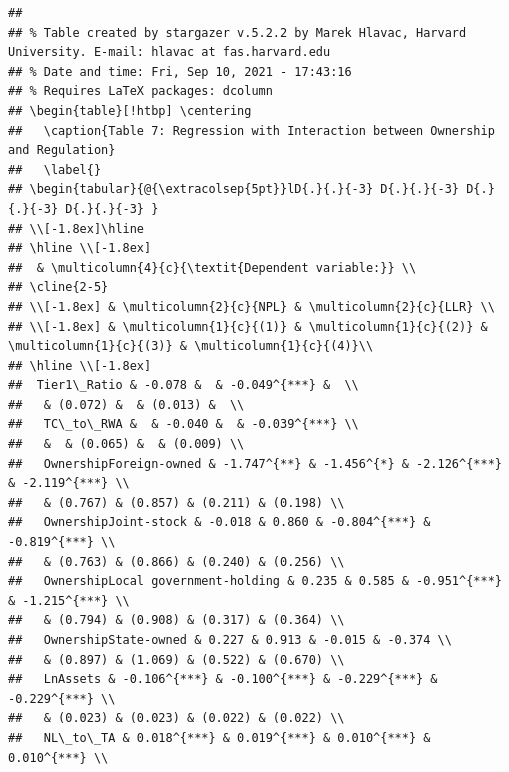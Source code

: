 \documentclass{article}
\begin{document}
\begin{verbatim}
## 
## % Table created by stargazer v.5.2.2 by Marek Hlavac, Harvard University. E-mail: hlavac at fas.harvard.edu
## % Date and time: Fri, Sep 10, 2021 - 17:43:16
## % Requires LaTeX packages: dcolumn 
## \begin{table}[!htbp] \centering 
##   \caption{Table 7: Regression with Interaction between Ownership and Regulation} 
##   \label{} 
## \begin{tabular}{@{\extracolsep{5pt}}lD{.}{.}{-3} D{.}{.}{-3} D{.}{.}{-3} D{.}{.}{-3} } 
## \\[-1.8ex]\hline 
## \hline \\[-1.8ex] 
##  & \multicolumn{4}{c}{\textit{Dependent variable:}} \\ 
## \cline{2-5} 
## \\[-1.8ex] & \multicolumn{2}{c}{NPL} & \multicolumn{2}{c}{LLR} \\ 
## \\[-1.8ex] & \multicolumn{1}{c}{(1)} & \multicolumn{1}{c}{(2)} & \multicolumn{1}{c}{(3)} & \multicolumn{1}{c}{(4)}\\ 
## \hline \\[-1.8ex] 
##  Tier1\_Ratio & -0.078 &  & -0.049^{***} &  \\ 
##   & (0.072) &  & (0.013) &  \\ 
##   TC\_to\_RWA &  & -0.040 &  & -0.039^{***} \\ 
##   &  & (0.065) &  & (0.009) \\ 
##   OwnershipForeign-owned & -1.747^{**} & -1.456^{*} & -2.126^{***} & -2.119^{***} \\ 
##   & (0.767) & (0.857) & (0.211) & (0.198) \\ 
##   OwnershipJoint-stock & -0.018 & 0.860 & -0.804^{***} & -0.819^{***} \\ 
##   & (0.763) & (0.866) & (0.240) & (0.256) \\ 
##   OwnershipLocal government-holding & 0.235 & 0.585 & -0.951^{***} & -1.215^{***} \\ 
##   & (0.794) & (0.908) & (0.317) & (0.364) \\ 
##   OwnershipState-owned & 0.227 & 0.913 & -0.015 & -0.374 \\ 
##   & (0.897) & (1.069) & (0.522) & (0.670) \\ 
##   LnAssets & -0.106^{***} & -0.100^{***} & -0.229^{***} & -0.229^{***} \\ 
##   & (0.023) & (0.023) & (0.022) & (0.022) \\ 
##   NL\_to\_TA & 0.018^{***} & 0.019^{***} & 0.010^{***} & 0.010^{***} \\ 

\end{verbatim}
\end{document}
